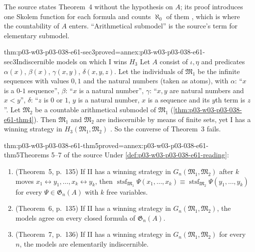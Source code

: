 The source states Theorem~4 without the hypothesis on \(A\); its proof
introduces one Skolem function for each formula and counts \(\aleph_0\) of
them \cite[p.~134]{Ehrenfeucht1961}, which is where the countability of
\(A\) enters. ``Arithmetical submodel'' is the source's term for elementary
submodel.

\begin{hbtheorem}{thm:p03-w03-p03-038-e61-sec3}{proved=annex:p03-w03-p03-038-e61-sec3}{Indiscernible models on which I wins \(H_3\)}
Let \(A\) consist of \(\iota,\eta\) and predicates \(\alpha(x)\),
\(\beta(x)\), \(\gamma(x,y)\), \(\delta(x,y,z)\). Let the individuals of
\(\mathfrak M_1\) be the infinite sequences with values \(0,1\) and the
natural numbers (taken as atoms), with \(\alpha\): ``\(x\) is a \(0\)-\(1\)
sequence'', \(\beta\): ``\(x\) is a natural number'', \(\gamma\): ``\(x,y\)
are natural numbers and \(x<y\)'', \(\delta\): ``\(z\) is \(0\) or \(1\),
\(y\) is a natural number, \(x\) is a sequence and its \(y\)th term is
\(z\)''. Let \(\mathfrak M_2\) be a countable arithmetical submodel of
\(\mathfrak M_1\) (\cref{thm:p03-w03-p03-038-e61-thm4}). Then
\(\mathfrak M_1\) and \(\mathfrak M_2\) are indiscernible by means of finite
sets, yet I has a winning strategy in \(H_3(\mathfrak M_1,\mathfrak M_2)\)
\cite[\S I.3, pp.~134--135]{Ehrenfeucht1961}. So the converse of Theorem~3
fails.
\end{hbtheorem}

\begin{hbtheorem}{thm:p03-w03-p03-038-e61-thm5}{proved=annex:p03-w03-p03-038-e61-thm5}{Theorems 5--7 of the source}
Under \cref{def:p03-w03-p03-038-e61-reading}:
\begin{enumerate}
\item (Theorem~5, p.~135) If II has a winning strategy in
      \(G_n(\mathfrak M_1,\mathfrak M_2)\) after \(k\) moves
      \(x_1\leftrightarrow y_1,\ldots,x_k\leftrightarrow y_k\), then
      \(\operatorname{stsf}_{\mathfrak M_1}\Psi(x_1,\ldots,x_k)\equiv
      \operatorname{stsf}_{\mathfrak M_2}\Psi(y_1,\ldots,y_k)\) for every
      \(\Psi\in\mathfrak G_n(A)\) with \(k\) free variables.
\item (Theorem~6, p.~135) If II has a winning strategy in
      \(G_n(\mathfrak M_1,\mathfrak M_2)\), the models agree on every closed
      formula of \(\mathfrak G_n(A)\).
\item (Theorem~7, p.~136) If II has a winning strategy in
      \(G_n(\mathfrak M_1,\mathfrak M_2)\) for every \(n\), the models are
      elementarily indiscernible.
\end{enumerate}
\end{hbtheorem}


